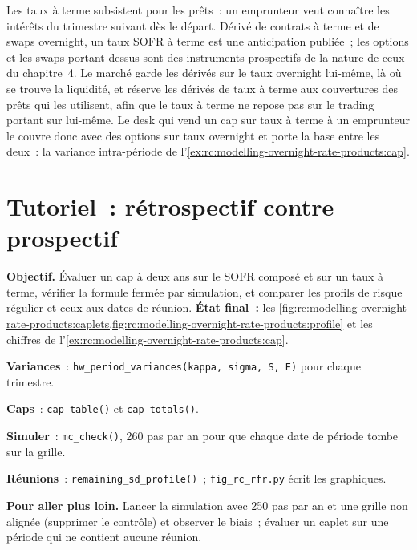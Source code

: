 Les taux à terme subsistent pour les prêts~: un emprunteur veut connaître les
intérêts du trimestre suivant dès le départ. Dérivé de contrats à terme et de swaps overnight, un taux
SOFR à terme est une anticipation publiée~; les options et les swaps portant dessus sont des
instruments prospectifs de la nature de ceux du chapitre~4. Le marché garde les dérivés sur le taux overnight
lui-même, là où se trouve la liquidité, et réserve les dérivés de taux à terme aux couvertures des
prêts qui les utilisent, afin que le taux à terme ne repose pas sur le trading
portant sur lui-même. Le desk qui vend un cap sur taux à terme à un emprunteur le couvre donc
avec des options sur taux overnight et porte la base entre les deux~: la
variance intra-période de l'\cref{ex:rc:modelling-overnight-rate-products:cap}.

\section{Tutoriel~: rétrospectif contre prospectif}\label{tut:rc:modelling-overnight-rate-products:tutorial}

\begin{tutorial}
\textbf{Objectif.} Évaluer un cap à deux ans sur le SOFR composé et sur un taux à terme, vérifier la
formule fermée par simulation, et comparer les profils de risque régulier et ceux aux dates de réunion.
\textbf{État final~:}
les \cref{fig:rc:modelling-overnight-rate-products:caplets,fig:rc:modelling-overnight-rate-products:profile}
et les chiffres de l'\cref{ex:rc:modelling-overnight-rate-products:cap}.
\begin{tutsteps}
\item \textbf{Variances}~: \texttt{hw\_period\_variances(kappa, sigma, S, E)} pour chaque
trimestre.
\item \textbf{Caps}~: \texttt{cap\_table()} et \texttt{cap\_totals()}.
\item \textbf{Simuler}~: \texttt{mc\_check()}, 260 pas par an pour que chaque
date de période tombe sur la grille.
\item \textbf{Réunions}~: \texttt{remaining\_sd\_profile()}~; \texttt{fig\_rc\_rfr.py}
écrit les graphiques.
\end{tutsteps}
\textbf{Pour aller plus loin.} Lancer la simulation avec 250 pas par an et une
grille non alignée (supprimer le contrôle) et observer le biais~; évaluer un caplet sur une période
qui ne contient aucune réunion.
\end{tutorial}


